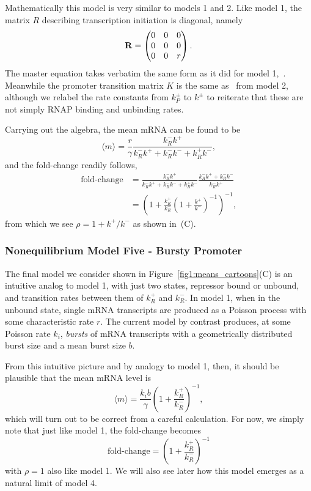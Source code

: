 Mathematically this model is very similar to models 1 and 2. Like model 1, the
matrix $R$ describing transcription initiation is diagonal, namely
\begin{equation}
\mathbf{R} = \begin{pmatrix}
                0 & 0 & 0 \\ 
                0 & 0 & 0 \\ 
                0 & 0 & r
        \end{pmatrix}.
\end{equation}
The master equation takes verbatim the same form as it did for model
1,~. Meanwhile the promoter transition matrix $K$ is the
same as~ from model 2, although we relabel the
rate constants from $k_P^\pm$ to $k^\pm$ to reiterate that these are not simply
RNAP binding and unbinding rates.

Carrying out the algebra, the mean mRNA can be found to be
\begin{equation}
\langle m\rangle = \frac{r}{\gamma}
\frac{k_R^- k^+}
{k_R^- k^+ + k_R^- k^- + k_R^+ k^-},
\end{equation}
and the fold-change readily follows,
\begin{align}
\text{fold-change}
&=      \frac{k_R^- k^+}{k_R^- k^+ + k_R^- k^- + k_R^+ k^-}
        \frac{k_R^- k^+ + k_R^- k^-}{k_R^- k^+}
\\
&=      \left(1 + \frac{k_R^+}{k_R^-}
                \left(1 + \frac{k^+}{k^-}\right)^{-1}
        \right)^{-1},
\end{align}
from which we see $\rho = 1 + k^+/k^-$ as shown in~(C).

\subsubsection{Nonequilibrium Model Five - Bursty Promoter}
The final model we consider shown in Figure~\ref{fig1:means_cartoons}(C) is an
intuitive analog to model 1, with just two states, repressor bound or unbound,
and transition rates between them of $k_R^+$ and $k_R^-$. In model 1, when in
the unbound state, single mRNA transcripts are produced as a Poisson process
with some characteristic rate $r$. The current model by contrast produces, at
some Poisson rate $k_i$, \textit{bursts} of mRNA transcripts with a
geometrically distributed burst size and a mean burst size $b$.

From this intuitive picture and by analogy to model 1, then, it should be
plausible that the mean mRNA level is
\begin{equation}
\langle m\rangle = \frac{k_i b}{\gamma}
        \left(1 + \frac{k_R^+}{k_R^-}\right)^{-1},
\end{equation}
which will turn out to be correct from a careful calculation. For now, we simply
note that just like model 1, the fold-change becomes
\begin{equation}
\text{fold-change} = \left(1 + \frac{k_R^+}{k_R^-}\right)^{-1}
\end{equation}
with $\rho=1$ also like model 1.
We will also see later how this model emerges as a natural limit of model 4.

